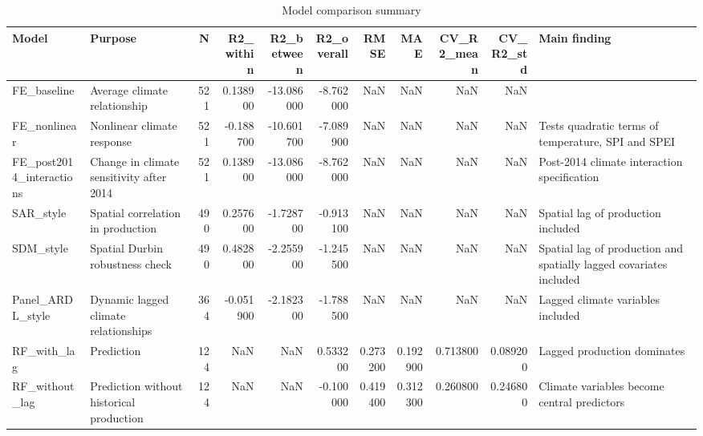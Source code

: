 \begin{table}
\caption{Model comparison summary}
\label{tab:model_comparison}
\begin{tabular}{llrrrrrrrrl}
\toprule
Model & Purpose & N & R2_within & R2_between & R2_overall & RMSE & MAE & CV_R2_mean & CV_R2_std & Main finding \\
\midrule
FE_baseline & Average climate relationship & 521 & 0.138900 & -13.086000 & -8.762000 & NaN & NaN & NaN & NaN &  \\
FE_nonlinear & Nonlinear climate response & 521 & -0.188700 & -10.601700 & -7.089900 & NaN & NaN & NaN & NaN & Tests quadratic terms of temperature, SPI and SPEI \\
FE_post2014_interactions & Change in climate sensitivity after 2014 & 521 & 0.138900 & -13.086000 & -8.762000 & NaN & NaN & NaN & NaN & Post-2014 climate interaction specification \\
SAR_style & Spatial correlation in production & 490 & 0.257600 & -1.728700 & -0.913100 & NaN & NaN & NaN & NaN & Spatial lag of production included \\
SDM_style & Spatial Durbin robustness check & 490 & 0.482800 & -2.255900 & -1.245500 & NaN & NaN & NaN & NaN & Spatial lag of production and spatially lagged covariates included \\
Panel_ARDL_style & Dynamic lagged climate relationships & 364 & -0.051900 & -2.182300 & -1.788500 & NaN & NaN & NaN & NaN & Lagged climate variables included \\
RF_with_lag & Prediction & 124 & NaN & NaN & 0.533200 & 0.273200 & 0.192900 & 0.713800 & 0.089200 & Lagged production dominates \\
RF_without_lag & Prediction without historical production & 124 & NaN & NaN & -0.100000 & 0.419400 & 0.312300 & 0.260800 & 0.246800 & Climate variables become central predictors \\
\bottomrule
\end{tabular}
\end{table}

